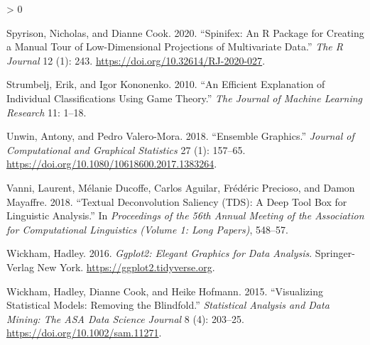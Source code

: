 \documentclass[
]{article}
\newlength{\cslhangindent}
\newenvironment{CSLReferences}[2] %
 {%
  \setlength{\parindent}{0pt}
  \ifodd #1 \everypar{\setlength{\hangindent}{\cslhangindent}}\ignorespaces\fi
  \ifnum #2 > 0
  \setlength{\parskip}{#2\baselineskip}
  \fi
 }%
 {}
\begin{document}
\begin{CSLReferences}{1}{0}
\leavevmode\hypertarget{ref-spyrison_spinifex_2020}{}%
Spyrison, Nicholas, and Dianne Cook. 2020. {``Spinifex: An {R} {Package} for {Creating} a {Manual} {Tour} of {Low}-Dimensional {Projections} of {Multivariate} {Data}.''} \emph{The R Journal} 12 (1): 243. \url{https://doi.org/10.32614/RJ-2020-027}.

\leavevmode\hypertarget{ref-strumbelj_efficient_2010}{}%
Strumbelj, Erik, and Igor Kononenko. 2010. {``An Efficient Explanation of Individual Classifications Using Game Theory.''} \emph{The Journal of Machine Learning Research} 11: 1--18.

\leavevmode\hypertarget{ref-unwin_ensemble_2018}{}%
Unwin, Antony, and Pedro Valero-Mora. 2018. {``Ensemble Graphics.''} \emph{Journal of Computational and Graphical Statistics} 27 (1): 157--65. \url{https://doi.org/10.1080/10618600.2017.1383264}.

\leavevmode\hypertarget{ref-vanni_textual_2018}{}%
Vanni, Laurent, Mélanie Ducoffe, Carlos Aguilar, Frédéric Precioso, and Damon Mayaffre. 2018. {``Textual {Deconvolution} {Saliency} ({TDS}): A Deep Tool Box for Linguistic Analysis.''} In \emph{Proceedings of the 56th {Annual} {Meeting} of the {Association} for {Computational} {Linguistics} ({Volume} 1: {Long} {Papers})}, 548--57.

\leavevmode\hypertarget{ref-wickham_ggplot2_2016}{}%
Wickham, Hadley. 2016. \emph{Ggplot2: {Elegant} {Graphics} for {Data} {Analysis}}. Springer-Verlag New York. \url{https://ggplot2.tidyverse.org}.

\leavevmode\hypertarget{ref-wickham_visualizing_2015}{}%
Wickham, Hadley, Dianne Cook, and Heike Hofmann. 2015. {``Visualizing Statistical Models: {Removing} the Blindfold.''} \emph{Statistical Analysis and Data Mining: The ASA Data Science Journal} 8 (4): 203--25. \url{https://doi.org/10.1002/sam.11271}.

\end{CSLReferences}
\end{document}
